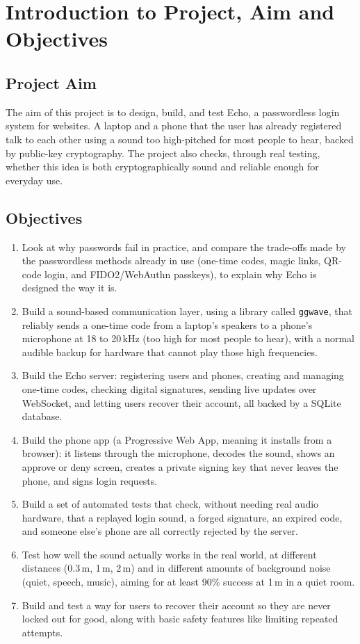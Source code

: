 \section{Introduction to Project, Aim and Objectives}

\subsection*{Project Aim}

The aim of this project is to design, build, and test Echo, a passwordless
login system for websites. A laptop and a phone that the user has already
registered talk to each other using a sound too high-pitched for most
people to hear, backed by public-key cryptography. The project also checks,
through real testing, whether this idea is both cryptographically sound and
reliable enough for everyday use.

\subsection*{Objectives}

\begin{enumerate}[label=\arabic*.]
  \item Look at why passwords fail in practice, and compare the trade-offs
  made by the passwordless methods already in use (one-time codes, magic
  links, QR-code login, and FIDO2/WebAuthn passkeys), to explain why Echo
  is designed the way it is.
  \item Build a sound-based communication layer, using a library called
  \texttt{ggwave}, that reliably sends a one-time code from a laptop's
  speakers to a phone's microphone at 18 to 20\,kHz (too high for most
  people to hear), with a normal audible backup for hardware that cannot
  play those high frequencies.
  \item Build the Echo server: registering users and phones, creating and
  managing one-time codes, checking digital signatures, sending live
  updates over WebSocket, and letting users recover their account, all
  backed by a SQLite database.
  \item Build the phone app (a Progressive Web App, meaning it installs
  from a browser): it listens through the microphone, decodes the sound,
  shows an approve or deny screen, creates a private signing key that
  never leaves the phone, and signs login requests.
  \item Build a set of automated tests that check, without needing real
  audio hardware, that a replayed login sound, a forged signature, an
  expired code, and someone else's phone are all correctly rejected by the
  server.
  \item Test how well the sound actually works in the real world, at
  different distances (0.3\,m, 1\,m, 2\,m) and in different amounts of
  background noise (quiet, speech, music), aiming for at least 90\%
  success at 1\,m in a quiet room.
  \item Build and test a way for users to recover their account so they
  are never locked out for good, along with basic safety features like
  limiting repeated attempts.
\end{enumerate}

